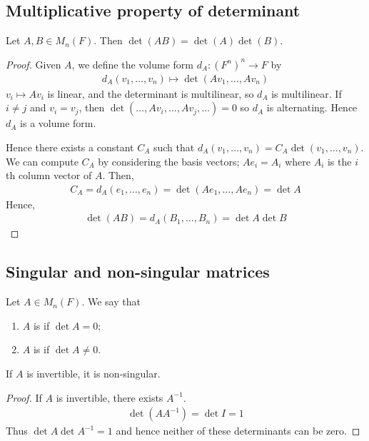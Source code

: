 \subsection{Multiplicative property of determinant}
\begin{lemma}
	Let $A, B \in M_n(F)$.
	Then $\det(AB) = \det(A) \det(B)$.
\end{lemma}
\begin{proof}
	Given $A$, we define the volume form $d_A \colon (F^n)^n \to F$ by
	\begin{align*}
		d_A(v_1, \dots, v_n) \mapsto \det(A v_1, \dots, A v_n)
	\end{align*}
	$v_i \mapsto A v_i$ is linear, and the determinant is multilinear, so $d_A$ is multilinear.
	If $i \neq j$ and $v_i = v_j$, then $\det(\dots, A v_i, \dots, A v_j, \dots) = 0$ so $d_A$ is alternating.
	Hence $d_A$ is a volume form.

	Hence there exists a constant $C_A$ such that $d_A(v_1, \dots, v_n) = C_A \det(v_1, \dots, v_n)$.
	We can compute $C_A$ by considering the basis vectors; $A e_i = A_i$ where $A_i$ is the $i$th column vector of $A$.
	Then,
	\begin{align*}
		C_A = d_A(e_1, \dots, e_n) = \det(Ae_1, \dots, Ae_n) = \det A
	\end{align*}
	Hence,
	\begin{align*}
		\det(AB) = d_A(B_1, \dots, B_n) = \det A \det B
	\end{align*}
\end{proof}

\subsection{Singular and non-singular matrices}
\begin{definition}[Singular]
	Let $A \in M_n(F)$.
	We say that
	\begin{enumerate}
		\item $A$ is  if $\det A = 0$;
		\item $A$ is  if $\det A \neq 0$.
	\end{enumerate}
\end{definition}

\begin{lemma}
	If $A$ is invertible, it is non-singular.
\end{lemma}

\begin{proof}
	If $A$ is invertible, there exists $A^{-1}$.
	\begin{align*}
		\det(A A^{-1}) = \det I = 1
	\end{align*}
	Thus $\det A \det A^{-1} = 1$ and hence neither of these determinants can be zero.
\end{proof}

